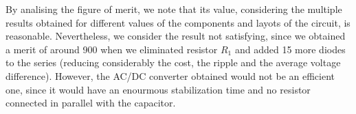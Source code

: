 By analising the figure of merit, we note that its value, considering the multiple results obtained for different values of the components and layots of the circuit, is
reasonable. Nevertheless, we consider the result not satisfying, since we obtained a merit of around 900 when we eliminated resistor $R_1$ and added 15 more diodes to the series
(reducing considerably the cost, the ripple and the average voltage difference). However, the AC/DC converter obtained would not be an efficient one, since it would have an enourmous
stabilization time and no resistor connected in parallel with the capacitor.

